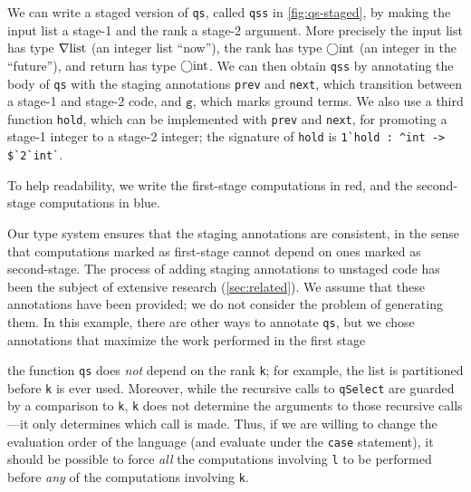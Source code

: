 \begin{abstrsyn}
We can write a staged version of \texttt{qs}, called
\texttt{qss} in \ref{fig:qs-staged}, by making the input list a
stage-1 and the rank a stage-2 argument. 
%
More precisely the input list
has type $\nabla\mathrm{list}$ (an integer list ``now''), the rank has
type $\bigcirc{\rm int}$ (an integer in the ``future''), and return has type
$\bigcirc{\rm int}$.  
%
We can then obtain \texttt{qss} by annotating the body of \texttt{qs}
with the staging annotations \texttt{prev} and \texttt{next}, which
transition between a stage-1 and stage-2 code, and $\texttt{g}$, which
marks ground terms.  
%
We also use a third function
\texttt{hold}, which can be implemented with \texttt{prev} and
\texttt{next}, for promoting a stage-1 integer to a stage-2 integer;
the signature of \texttt{hold} is
% 
\lstinline{1`hold : ^int -> $`2`int`}.

To help readability, we write the first-stage
computations in red, and the second-stage computations in blue.

Our type system ensures that the staging annotations are consistent,
in the sense that computations marked as first-stage cannot depend on
ones marked as second-stage.
%
The process of adding staging annotations to unstaged code has been
the subject of extensive research (\ref{sec:related}). We assume that
these annotations have been provided; we do not consider the problem
of generating them. In this example, there are other ways to annotate
\texttt{qs}, but we chose annotations that maximize the work performed
in the first stage






the
function \texttt{qs} does \emph{not} depend on the rank \texttt{k};
for example, the list is partitioned before \texttt{k} is ever
used. Moreover, while the recursive calls to \texttt{qSelect} are
guarded by a comparison to \texttt{k}, \texttt{k} does not determine
the arguments to those recursive calls---it only determines which call
is made. Thus, if we are willing to change the evaluation order of the
language (and evaluate under the \texttt{case} statement), it should
be possible to force \emph{all} the computations involving \texttt{l}
to be performed before \emph{any} of the computations involving
\texttt{k}.




\end{abstrsyn}
